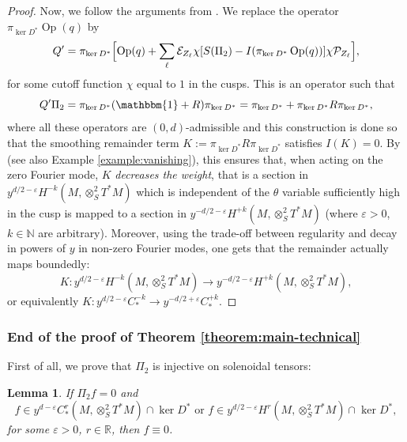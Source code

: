 \documentclass[10pt]{amsart}
\newcommand{\R}{\mathbb{R}}
\newcommand{\N}{\mathbb{N}}
\newcommand{\eps}{\varepsilon}
\DeclareMathOperator{\Op}{Op}
\theoremstyle{plain}
\newtheorem{lemma}{Lemma}[section]
\theoremstyle{definition}
\begin{document}
\begin{proof}
Now, we follow the arguments from \cite[\S 4.2.3]{Bonthonneau-Lefeuvre-19-1}. We replace the operator $\pi_{\ker D^\ast} \Op(q)$ by
\[
Q' = \pi_{\ker D^\ast}\Bigl[ \Op(q) + \sum_\ell \mathcal{E}_{Z_\ell} \chi [ S(\Pi_2) - I(\pi_{\ker D^\ast} \Op(q))] \chi \mathcal{P}_{Z_\ell} \Bigr],
\]
for some cutoff function $\chi$ equal to $1$ in the cusps. This is an operator such that
\[
Q'\Pi_2 = \pi_{\ker D^*}(\mathbbm{1} + R)\pi_{\ker D^*} = \pi_{\ker D^*} + \pi_{\ker D^*}R\pi_{\ker D^*},
\]
where all these operators are $(0,d)$-admissible and this construction is done so that the smoothing remainder term $K:= \pi_{\ker D^*}R\pi_{\ker D^*}$ satisfies $I(K) = 0$. By \cite[Lem.\,4.10]{Bonthonneau-Lefeuvre-19-1} (see also Example \ref{example:vanishing}), this ensures that, when acting on the zero Fourier mode, $K$ \emph{decreases the weight}, that is a section in $y^{d/2-\eps} H^{-k}(M,\otimes^2_S T^*M)$ which is independent of the $\theta$ variable sufficiently high in the cusp is mapped to a section in $y^{-d/2-\eps} H^{+k}(M,\otimes^2_S T^*M)$ (where $\eps > 0$, $k \in \N$ are arbitrary). Moreover, using the trade-off \cite[Lem.\,4.3]{Bonthonneau-Lefeuvre-19-1} between regularity and decay in powers of $y$ in non-zero Fourier modes, one gets that the remainder actually maps boundedly:
\[
K : y^{d/2-\eps} H^{-k}(M,\otimes^2_S T^*M) \to y^{-d/2-\eps} H^{+k}(M,\otimes^2_S T^*M),
\]
or equivalently $K : y^{d/2-\eps} C^{-k}_* \to y^{-d/2+\eps} C^{+k}_*$.
\end{proof}

\subsubsection{End of the proof of Theorem \ref{theorem:main-technical}}

First of all, we prove that $\Pi_2$ is injective on solenoidal tensors:

\begin{lemma}
If $\Pi_2 f = 0$ and
\[
f \in y^{d-\eps} C^r_*(M,\otimes^2_S T^*M) \cap \ker D^* \text{ or } f \in y^{d/2-\eps} H^r(M,\otimes^2_S T^*M) \cap \ker D^*,
\]
for some $\eps > 0$, $r \in \R$, then $f \equiv 0$.
\end{lemma}
\end{document}
